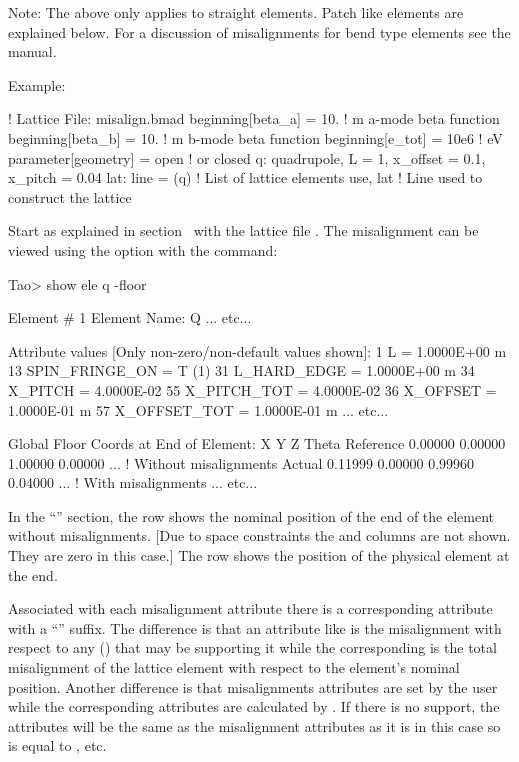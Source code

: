 \documentclass{hitec}     %
\begin{document}
{Note: The above only applies to straight elements. Patch like elements are explained below. For a
discussion of misalignments for bend type elements see the \bmad manual.

Example:
\begin{code}
! Lattice File: misalign.bmad
beginning[beta_a] = 10.   ! m  a-mode beta function
beginning[beta_b] = 10.   ! m  b-mode beta function
beginning[e_tot] = 10e6   ! eV
parameter[geometry] = open  ! or closed
q: quadrupole, L = 1, x_offset = 0.1, x_pitch = 0.04
lat: line = (q)   ! List of lattice elements
use, lat          ! Line used to construct the lattice
\end{code}

Start \tao as explained in section~ with the lattice file . The
misalignment can be viewed using the  option with the  command:
\begin{code} 
Tao> show ele q -floor

 Element #                1
 Element Name: Q
... etc...

 Attribute values [Only non-zero/non-default values shown]:
    1  L               =  1.0000E+00 m
   13  SPIN_FRINGE_ON  =  T (1)
   31  L_HARD_EDGE     =  1.0000E+00 m
   34  X_PITCH         =  4.0000E-02       55  X_PITCH_TOT   =  4.0000E-02
   36  X_OFFSET        =  1.0000E-01 m     57  X_OFFSET_TOT  =  1.0000E-01 m
... etc...

Global Floor Coords at End of Element:
                X        Y        Z    Theta  
Reference  0.00000  0.00000  1.00000  0.00000 ... ! Without misalignments
Actual     0.11999  0.00000  0.99960  0.04000 ... ! With misalignments
... etc...
\end{code}

In the ``'' section, the  row shows the nominal position of
the  end of the element without misalignments. [Due to space constraints the  and
 columns are not shown. They are zero in this case.] The  row shows the position
of the physical element at the  end.

Associated with each misalignment attribute there is a corresponding attribute with a ``''
suffix. The difference is that an attribute like  is the misalignment with respect to
any  () that may be supporting it while the corresponding
 is the total misalignment of the lattice element with respect to the element's
nominal position. Another difference is that misalignments attributes are set by the user while the
corresponding  attributes are calculated by \bmad. If there is no  support, the
 attributes will be the same as the misalignment attributes as it is in this case so
 is equal to , etc.

}
\end{document}
